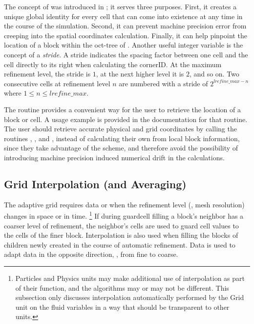 The concept of  was introduced in \flashx; it serves three
purposes. First, it creates a unique global identity for every cell
that can come into existence at any time in the course of the
simulation.   Second, it can prevent machine precision error from
creeping into the spatial coordinates calculation. Finally, it can
help pinpoint the location of a block within the oct-tree of
\Paramesh. Another useful integer variable is the concept of a {\it
stride}. A stride indicates the spacing factor between one cell and
the cell directly to its right when calculating the cornerID.   At the
maximum refinement level, the stride is $1$, at the next higher level
it is $2$, and so on. Two consecutive cells at refinement level $n$
are numbered with a stride of $2^{lrefine\_max-n}$ where $1 \le n \le
lrefine\_max$.

The routine  provides a convenient way
for the user to retrieve the location of a block or cell.  A usage
example is provided in the  documentation for that routine.
The user should retrieve accurate physical and grid coordinates by
calling the routines ,
,  and
, instead of calculating their own
from local block information, since they take advantage of the
 scheme, and therefore avoid the possibility of
introducing machine precision induced numerical drift in the calculations.


\subsection[Grid Interpolation]{Grid Interpolation (and Averaging)}
\label{Sec:gridinterp}
The adaptive grid requires data  or
 when the refinement level 
(\ie, mesh resolution) changes in space or in time.
\footnote{Particles and Physics units may make additional use of
interpolation as part 
of their function, and the algorithms may or may not be different.
This subsection only discusses interpolation automatically performed by the
\unit{Grid} unit on the fluid variables in a way that should be transparent to other units.}
If during guardcell filling a block's neighbor has a coarser level of
refinement, the neighbor's cells are used to 
guard cell values to the cells of the finer block. 
Interpolation%
is also used when filling the blocks
of children newly created in the course of automatic refinement.
Data  is used to adapt data in the opposite direction, \ie,
from fine to coarse.

